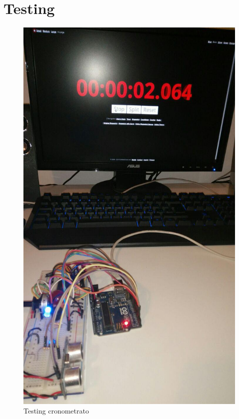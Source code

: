 \chapter{Testing}

\begin{figure}[!ht]
	\centering
	\includegraphics[scale=.25]{img/testing/testing1.jpg}
	\caption{Testing cronometrato}
\end{figure}

